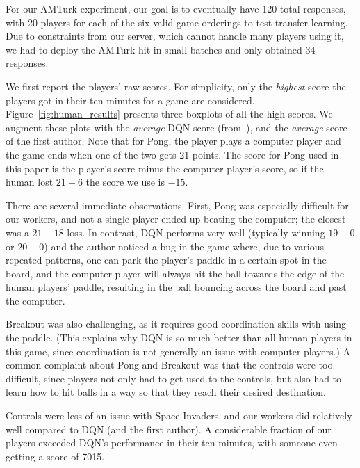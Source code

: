 \documentclass[letterpaper, 10 pt, conference]{ieeeconf}  %
\begin{document}
For our AMTurk experiment, our goal is to eventually have 120 total responses, with 20 players for
each of the six valid game orderings to test transfer learning. Due to constraints from our server,
which cannot handle many players using it, we had to deploy the AMTurk hit in small batches and only
obtained 34 responses.

We first report the players' raw scores. For simplicity, only the \emph{highest} score the players
got in their ten minutes for a game are considered. Figure~\ref{fig:human_results} presents three
boxplots of all the high scores. We augment these plots with the \emph{average} DQN score
(from~\cite{mnih-dqn-2015}), and the \emph{average} score of the first author. Note that for Pong,
the player plays a computer player and the game ends when one of the two gets 21 points. The score
for Pong used in this paper is the player's score minus the computer player's score, so if the human
lost $21-6$ the score we use is $-15$.

There are several immediate observations. First, Pong was especially difficult for our workers, and
not a single player ended up beating the computer; the closest was a $21-18$ loss. In contrast, DQN
performs very well (typically winning $19-0$ or $20-0$) and the author noticed a bug in the game
where, due to various repeated patterns, one can park the player's paddle in a certain spot in the
board, and the computer player will always hit the ball towards the edge of the human players'
paddle, resulting in the ball bouncing across the board and past the computer.

Breakout was also challenging, as it requires good coordination skills with using the paddle. (This
explains why DQN is so much better than all human players in this game, since coordination is not
generally an issue with computer players.) A common complaint about Pong and Breakout was that the
controls were too difficult, since players not only had to get used to the controls, but also had to
learn how to hit balls in a way so that they reach their desired destination.

Controls were less of an issue with Space Invaders, and our workers did relatively well compared to
DQN (and the first author). A considerable fraction of our players exceeded DQN's performance in
their ten minutes, with someone even getting a score of 7015.
\end{document}

